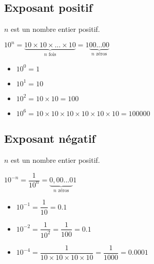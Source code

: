 \subsection{Exposant positif}


\begin{mydef}
	$n$ est un nombre entier positif.
	
	$10^n = \underbrace{10 \times 10 \times ... \times 10}_\textrm{$n$ fois} = 1 \underbrace{00...00}_\textrm{$n$ zéros}$
\end{mydef}

\begin{myexs}
	\begin{multicols}{2}
		
		
		\begin{itemize}
			\item $10^0 = 1$
			\item $10^1 = 10$
			\item $10^2 = 10 \times 10 = 100$
			\item $10^6 = 10 \times 10 \times 10 \times 10 \times 10 \times 10 = \num{100000}$
		\end{itemize}

	\end{multicols}
\end{myexs}

\subsection{Exposant négatif}

\begin{mydef}
	$n$ est un nombre entier positif.
	
	$10^{-n} = \dfrac{1}{10^n} = \underbrace{0,00...0}_\textrm{$n$ zéros} 1$
\end{mydef}

\begin{myexs}
	\begin{multicols}{2}
		\begin{itemize}
			\item $10^{-1} = \dfrac{1}{10} = \num{0.1}$
			\item $10^{-2} = \dfrac{1}{10^2} = \dfrac{1}{100} = \num{0.1}$
			\item $10^{-4} = \dfrac{1}{10 \times 10 \times 10 \times 10 } = \dfrac{1}{\num{1000}} = \num{0.0001}$ 
		\end{itemize}
	\end{multicols}
	
\end{myexs}